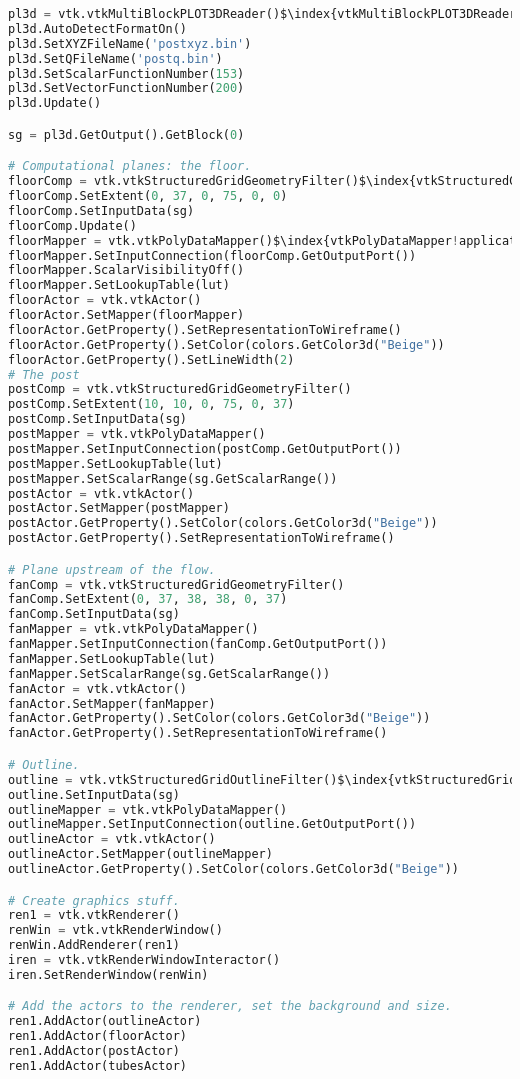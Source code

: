 \begin{lstlisting}[language=Python, caption={Display the computational grid.}, escapechar=\$]
pl3d = vtk.vtkMultiBlockPLOT3DReader()$\index{vtkMultiBlockPLOT3DReader!application}$
pl3d.AutoDetectFormatOn()
pl3d.SetXYZFileName('postxyz.bin')
pl3d.SetQFileName('postq.bin')
pl3d.SetScalarFunctionNumber(153)
pl3d.SetVectorFunctionNumber(200)
pl3d.Update()

sg = pl3d.GetOutput().GetBlock(0)

# Computational planes: the floor.
floorComp = vtk.vtkStructuredGridGeometryFilter()$\index{vtkStructuredGridGeometryFilter!application}$
floorComp.SetExtent(0, 37, 0, 75, 0, 0)
floorComp.SetInputData(sg)
floorComp.Update()
floorMapper = vtk.vtkPolyDataMapper()$\index{vtkPolyDataMapper!application}$
floorMapper.SetInputConnection(floorComp.GetOutputPort())
floorMapper.ScalarVisibilityOff()
floorMapper.SetLookupTable(lut)
floorActor = vtk.vtkActor()
floorActor.SetMapper(floorMapper)
floorActor.GetProperty().SetRepresentationToWireframe()
floorActor.GetProperty().SetColor(colors.GetColor3d("Beige"))
floorActor.GetProperty().SetLineWidth(2)
# The post
postComp = vtk.vtkStructuredGridGeometryFilter()
postComp.SetExtent(10, 10, 0, 75, 0, 37)
postComp.SetInputData(sg)
postMapper = vtk.vtkPolyDataMapper()
postMapper.SetInputConnection(postComp.GetOutputPort())
postMapper.SetLookupTable(lut)
postMapper.SetScalarRange(sg.GetScalarRange())
postActor = vtk.vtkActor()
postActor.SetMapper(postMapper)
postActor.GetProperty().SetColor(colors.GetColor3d("Beige"))
postActor.GetProperty().SetRepresentationToWireframe()

# Plane upstream of the flow.
fanComp = vtk.vtkStructuredGridGeometryFilter()
fanComp.SetExtent(0, 37, 38, 38, 0, 37)
fanComp.SetInputData(sg)
fanMapper = vtk.vtkPolyDataMapper()
fanMapper.SetInputConnection(fanComp.GetOutputPort())
fanMapper.SetLookupTable(lut)
fanMapper.SetScalarRange(sg.GetScalarRange())
fanActor = vtk.vtkActor()
fanActor.SetMapper(fanMapper)
fanActor.GetProperty().SetColor(colors.GetColor3d("Beige"))
fanActor.GetProperty().SetRepresentationToWireframe()

# Outline.
outline = vtk.vtkStructuredGridOutlineFilter()$\index{vtkStructuredGridOutlineFilter!application}$
outline.SetInputData(sg)
outlineMapper = vtk.vtkPolyDataMapper()
outlineMapper.SetInputConnection(outline.GetOutputPort())
outlineActor = vtk.vtkActor()
outlineActor.SetMapper(outlineMapper)
outlineActor.GetProperty().SetColor(colors.GetColor3d("Beige"))

# Create graphics stuff.
ren1 = vtk.vtkRenderer()
renWin = vtk.vtkRenderWindow()
renWin.AddRenderer(ren1)
iren = vtk.vtkRenderWindowInteractor()
iren.SetRenderWindow(renWin)

# Add the actors to the renderer, set the background and size.
ren1.AddActor(outlineActor)
ren1.AddActor(floorActor)
ren1.AddActor(postActor)
ren1.AddActor(tubesActor)
\end{lstlisting}

